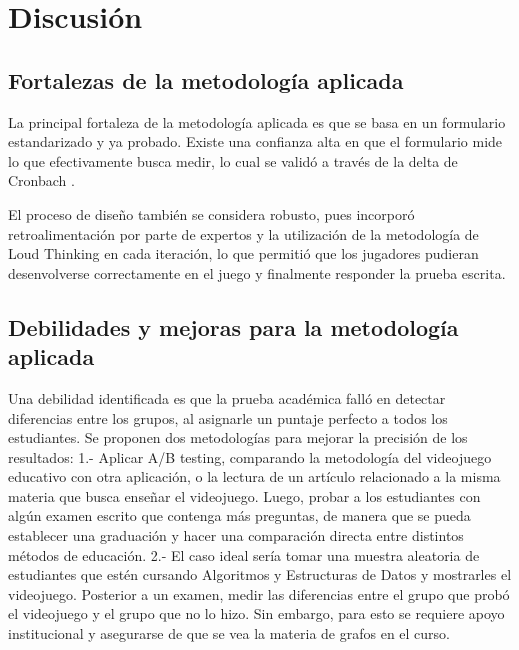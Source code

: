 \chapter{Discusión}



\section{Fortalezas de la metodología aplicada}

La principal fortaleza de la metodología aplicada es que se basa en un formulario estandarizado y ya probado. Existe una confianza alta en que el formulario mide lo que efectivamente busca medir, lo cual se validó a través de la delta de Cronbach \cite{meegaplus}.

El proceso de diseño también se considera robusto, pues incorporó retroalimentación por parte de expertos y la utilización de la metodología de Loud Thinking en cada iteración, lo que permitió que los jugadores pudieran desenvolverse correctamente en el juego y finalmente responder la prueba escrita.



\section{Debilidades y mejoras para la metodología aplicada}

Una debilidad identificada es que la prueba académica falló en detectar diferencias entre los grupos, al asignarle un puntaje perfecto a todos los estudiantes. Se proponen dos metodologías para mejorar la precisión de los resultados: 1.- Aplicar A/B testing, comparando la metodología del videojuego educativo con otra aplicación, o la lectura de un artículo relacionado a la misma materia que busca enseñar el videojuego. Luego, probar a los estudiantes con algún examen escrito que contenga más preguntas, de manera que se pueda establecer una graduación y hacer una comparación directa entre distintos métodos de educación. 2.- El caso ideal sería tomar una muestra aleatoria de estudiantes que estén cursando Algoritmos y Estructuras de Datos y mostrarles el videojuego. Posterior a un examen, medir las diferencias entre el grupo que probó el videojuego y el grupo que no lo hizo. Sin embargo, para esto se requiere apoyo institucional y asegurarse de que se vea la materia de grafos en el curso. 

